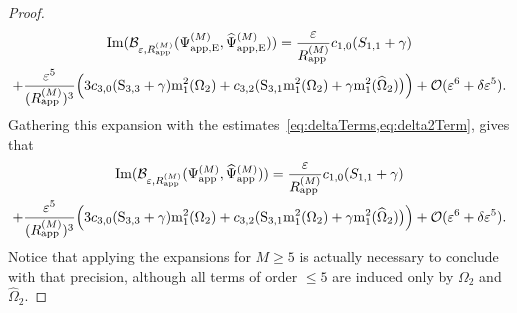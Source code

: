 \documentclass[11pt,reqno,a4paper]{amsart}
\def\eps{\varepsilon}
\def\Im{{\rm Im}}
\newcommand{\cB}{\mathcal{B}}
\newcommand{\cO}{\mathcal{O}}
\newcommand{\mrm}{\mathrm{m}}
\newcommand{\1}{\mathbbm{1}}
\theoremstyle{definition}
\theoremstyle{definition}
\numberwithin{equation}{section}
\newcommand{\Mapp}[2]{#1^{(#2)}_\mathrm{app}}
\newcommand{\Mappp}[3]{#1^{(#2)}_\mathrm{app,#3}}
\begin{document}
\begin{proof}
    \begin{multline}
        \Im(\cB_{\eps,\Mapp{R}{M}}(\Mappp{\Psi}{M}{E},\Mappp{\widehat{\Psi}}{M}{E})) =  \frac{\eps}{\Mapp{R}{M}} c_{1,0} (S_{1,1}+\gamma) \\ + \frac{\eps^5}{(\Mapp{R}{M})^3} \Big(3c_{3,0}({\rm S}_{3,3}+\gamma) \mrm_1^2(\Omega_2) + c_{3,2} ({\rm S}_{3,1} \mrm_1^2(\Omega_2)+\gamma \mrm_1^2(\widehat{\Omega}_2)\big) \Big) + \cO(\eps^6 + \delta \eps^5).
    \end{multline}
    Gathering this expansion with the estimates~\cref{eq:deltaTerms,eq:delta2Term}, gives that
    \begin{multline}
         \Im(\cB_{\eps,\Mapp{R}{M}}(\Mapp{\Psi}{M},\Mapp{\widehat{\Psi}}{M})) = \frac{\eps}{\Mapp{R}{M}} c_{1,0} (S_{1,1}+\gamma) \\ + \frac{\eps^5}{(\Mapp{R}{M})^3} \Big(3c_{3,0}({\rm S}_{3,3}+\gamma) \mrm_1^2(\Omega_2) + c_{3,2} ({\rm S}_{3,1} \mrm_1^2(\Omega_2)+\gamma \mrm_1^2(\widehat{\Omega}_2)\big) \Big) + \cO(\eps^6 + \delta \eps^5).
    \end{multline}
    Notice that applying the expansions for $M \ge 5$ is actually necessary to conclude with that precision, although all terms of order $\le 5$ are induced only by $\Omega_2$ and $\widehat{\Omega}_2$. 


\end{proof}
\end{document}
